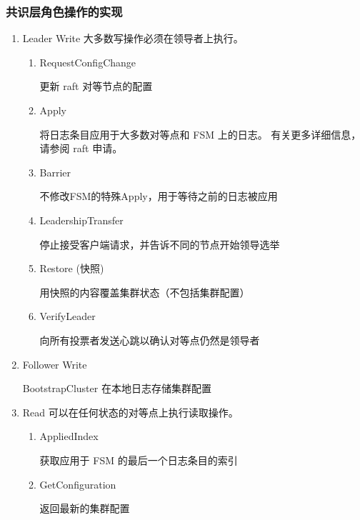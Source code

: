         \subsubsection{共识层角色操作的实现}
		\begin{enumerate}
			\item Leader Write
			大多数写操作必须在领导者上执行。
			
			\begin{enumerate}
			
				\item RequestConfigChange 
				
				更新 raft 对等节点的配置
			
				\item Apply 
				
				将日志条目应用于大多数对等点和 FSM 上的日志。 有关更多详细信息，请参阅 raft 申请。

				\item Barrier 
				
				不修改FSM的特殊Apply，用于等待之前的日志被应用			
				
				\item LeadershipTransfer 
				
				停止接受客户端请求，并告诉不同的节点开始领导选举

				\item Restore (快照) 
			
				用快照的内容覆盖集群状态（不包括集群配置）
				
				\item VerifyLeader 
				
				向所有投票者发送心跳以确认对等点仍然是领导者				

			\end{enumerate}


			\item Follower Write
			

			BootstrapCluster 在本地日志存储集群配置

			\item Read
			可以在任何状态的对等点上执行读取操作。
			
			\begin{enumerate}
			
				\item AppliedIndex	
				
				获取应用于 FSM 的最后一个日志条目的索引
			
				\item GetConfiguration
				
				返回最新的集群配置
				

\end{enumerate}
\end{enumerate}
